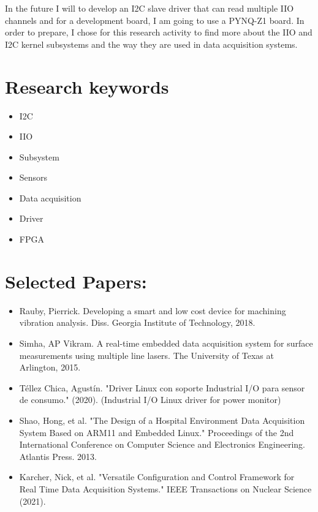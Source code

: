 \documentclass[l2pt, letterpaper]{article}
\begin{document}
In the future I will to develop an I2C slave driver that can read multiple IIO
channels and for a development board, I am going to use a PYNQ-Z1 board. In
order to prepare, I chose for this research activity to find more about the IIO and
I2C kernel subsystems and the way they are used in data acquisition systems.


\newpage
\section{Research keywords}

\begin{itemize}
    \item I2C
    \item IIO
    \item Subsystem
    \item Sensors
    \item Data acquisition
    \item Driver
    \item FPGA
\end{itemize}


\newpage
\section{Selected Papers:}
\begin{itemize}
    \item Rauby, Pierrick. Developing a smart and low cost device for machining vibration analysis.
Diss. Georgia Institute of Technology, 2018.
    \item Simha, AP Vikram. A real-time embedded data acquisition system for surface measurements
using multiple line lasers. The University of Texas at Arlington, 2015.
     \item Téllez Chica, Agustín. "Driver Linux con soporte Industrial I/O para sensor de consumo."
(2020). (Industrial I/O Linux driver for power monitor)
    \item Shao, Hong, et al. "The Design of a Hospital Environment Data Acquisition System Based on
ARM11 and Embedded Linux." Proceedings of the 2nd International Conference on
Computer Science and Electronics Engineering. Atlantis Press. 2013.
    \item Karcher, Nick, et al. "Versatile Configuration and Control Framework for Real Time Data
Acquisition Systems." IEEE Transactions on Nuclear Science (2021).

\end{itemize}
\end{document}
